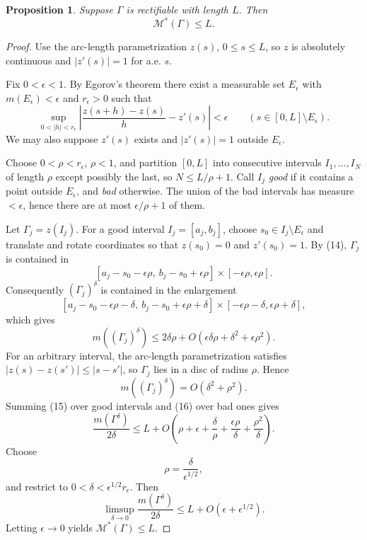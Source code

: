 \documentclass[11pt,openany]{book}
\newtheorem{proposition}[theorem]{Proposition}
\begin{document}
\begin{proposition}
Suppose $\Gamma$ is rectifiable with length $L$. Then
\[
\mathcal M^*(\Gamma)\le L.
\]
\end{proposition}

\begin{proof}
Use the arc-length parametrization $z(s)$, $0\le s\le L$, so $z$ is absolutely continuous and $|z'(s)|=1$ for a.e. $s$.

Fix $0<\epsilon<1$. By Egorov's theorem there exist a measurable set $E_\epsilon$ with $m(E_\epsilon)<\epsilon$ and $r_\epsilon>0$ such that
\begin{equation}
\sup_{0<|h|<r_\epsilon}
\left|\frac{z(s+h)-z(s)}h-z'(s)\right|<\epsilon
\qquad(s\in[0,L]\setminus E_\epsilon).
\tag{14}
\end{equation}
We may also suppose $z'(s)$ exists and $|z'(s)|=1$ outside $E_\epsilon$.

Choose $0<\rho<r_\epsilon$, $\rho<1$, and partition $[0,L]$ into consecutive intervals $I_1,\ldots,I_N$ of length $\rho$ except possibly the last, so $N\le L/\rho+1$. Call $I_j$ \emph{good} if it contains a point outside $E_\epsilon$, and \emph{bad} otherwise. The union of the bad intervals has measure $<\epsilon$, hence there are at most $\epsilon/\rho+1$ of them.

Let $\Gamma_j=z(I_j)$. For a good interval $I_j=[a_j,b_j]$, choose $s_0\in I_j\setminus E_\epsilon$ and translate and rotate coordinates so that $z(s_0)=0$ and $z'(s_0)=1$. By (14), $\Gamma_j$ is contained in
\[
[a_j-s_0-\epsilon\rho,\ b_j-s_0+\epsilon\rho]
\times[-\epsilon\rho,\epsilon\rho].
\]
Consequently $(\Gamma_j)^\delta$ is contained in the enlargement
\[
[a_j-s_0-\epsilon\rho-\delta,\ b_j-s_0+\epsilon\rho+\delta]
\times[-\epsilon\rho-\delta,\epsilon\rho+\delta],
\]
which gives
\begin{equation}
m((\Gamma_j)^\delta)
\le2\delta\rho+O(\epsilon\delta\rho+\delta^2+\epsilon\rho^2).
\tag{15}
\end{equation}
For an arbitrary interval, the arc-length parametrization satisfies $|z(s)-z(s')|\le|s-s'|$, so $\Gamma_j$ lies in a disc of radius $\rho$. Hence
\begin{equation}
m((\Gamma_j)^\delta)=O(\delta^2+\rho^2).
\tag{16}
\end{equation}
Summing (15) over good intervals and (16) over bad ones gives
\[
\frac{m(\Gamma^\delta)}{2\delta}
\le L+O\left(
\rho+\epsilon+\frac\delta\rho+\frac{\epsilon\rho}\delta
+\frac{\rho^2}\delta
\right).
\]
Choose
\[
\rho=\frac\delta{\epsilon^{1/2}},
\]
and restrict to $0<\delta<\epsilon^{1/2}r_\epsilon$. Then
\[
\limsup_{\delta\to0}\frac{m(\Gamma^\delta)}{2\delta}
\le L+O(\epsilon+\epsilon^{1/2}).
\]
Letting $\epsilon\to0$ yields $\mathcal M^*(\Gamma)\le L$.
\end{proof}
\end{document}
